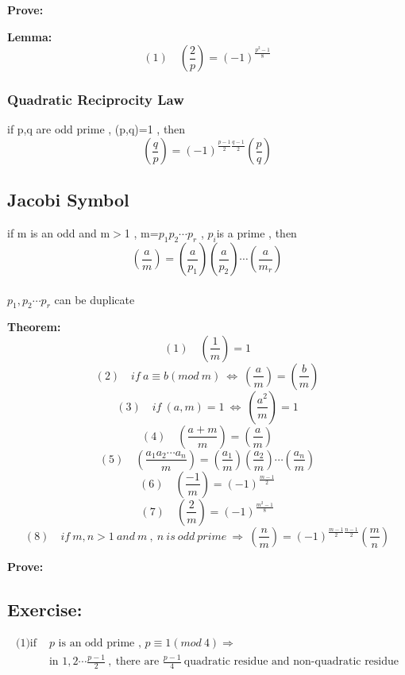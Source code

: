 \documentclass{ctexart}
\begin{document}
\vspace{12 pt}
\textbf{Prove:}


\vspace{12 pt}
\textbf{Lemma:}
\[(1)\quad (\frac{2}{p})=(-1)^{\frac{p^2-1}{8}}  \]

\vspace{12 pt}
\subsubsection{Quadratic Reciprocity Law}
if p,q are odd prime , (p,q)=1 , then
\[(\frac{q}{p})=(-1)^{\frac{p-1}{2}\frac{q-1}{2}}(\frac{p}{q})\]

\vspace{12 pt}
\subsection{Jacobi Symbol}
if m is an odd and m$>$1 , m=\(p_1p_2\cdots p_r\) , \(p_i\)is a prime , then
\[(\frac{a}{m})=(\frac{a}{p_1})(\frac{a}{p_2})\cdots(\frac{a}{m_r})\]
\\\(p_1,p_2\cdots p_r\) can be duplicate

\vspace{12 pt}
\textbf{Theorem:}
\[(1)\quad(\frac{1}{m})=1\]
\[(2)\quad if \ a\equiv b(mod\ m)\ \Leftrightarrow \ (\frac{a}{m})=(\frac{b}{m})\]
\[(3)\quad if\ (a,m)=1\ \Leftrightarrow \ (\frac{a^2}{m})=1\]
\[(4)\quad (\frac{a+m}{m})=(\frac{a}{m})\]
\[(5)\quad (\frac{a_1a_2\cdots a_n}{m})=(\frac{a_1}{m})(\frac{a_2}{m})\cdots (\frac{a_n}{m})\]
\[(6)\quad(\frac{-1}{m})=(-1)^{\frac{m-1}{2}}\]
\[(7)\quad (\frac{2}{m})=(-1)^{\frac{m^2-1}{8}}\]
\[(8)\quad if\ m,n>1\ and \ m\ ,\ n\ is \ odd \ prime\ \Rightarrow \ (\frac{n}{m})=(-1)^{\frac{m-1}{2}\frac{n-1}{2}}(\frac{m}{n})\]

\vspace{12 pt}
\textbf{Prove:}

\vspace{12 pt}
\subsection{Exercise:}
\begin{align*}
\text{(1)if }&p \text{ is an odd prime , }p\equiv 1(mod\ 4) \Rightarrow\\
&\text{in }1,2\cdots \frac{p-1}{2}\ ,\ \text{there are }\frac{p-1}{4}\ \text{quadratic residue and non-quadratic residue} \\
\end{align*}
\end{document}
